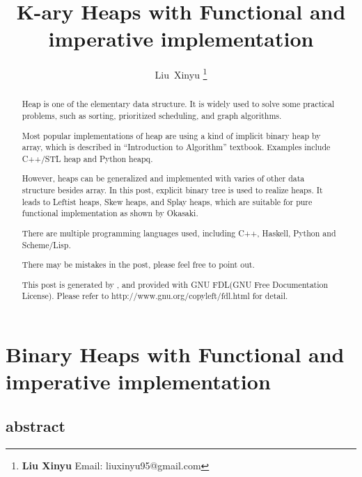\documentclass{article}
\begin{document}
\fi


\title{K-ary Heaps with Functional and imperative implementation}

\author{Liu~Xinyu
\thanks{{\bfseries Liu Xinyu } \newline
  Email: liuxinyu95@gmail.com \newline}
  }


\maketitle

\ifx\wholebook\relax
\chapter{Binary Heaps with Functional and imperative implementation}

\section{abstract}
\else
\begin{abstract}
\fi
Heap is one of the elementary data structure. It is widely used
to solve some practical problems, such as sorting, prioritized
scheduling, and graph algorithms\cite{wiki-heap}. 

Most popular implementations of heap are using a kind of implicit
binary heap by array, which is described in ``Introduction to 
Algorithm'' textbook\cite{CLRS}. Examples include C++/STL
heap and Python heapq.

However, heaps can be generalized and implemented with varies
of other data structure besides array. In this post, explicit
binary tree is used to realize heaps. It leads to Leftist heaps, Skew heaps,
and Splay heaps, which are suitable for pure functional implementation as shown
by Okasaki\cite{okasaki-book}.

There are multiple programming languages used, including
C++, Haskell, Python and Scheme/Lisp.

There may be mistakes in the post, please feel free to point out.

This post is generated by \LaTeXe, and provided with GNU FDL(GNU Free Documentation License).
Please refer to http://www.gnu.org/copyleft/fdl.html for detail.

\ifx\wholebook\relax \else
\end{abstract}
\fi
\end{document}
